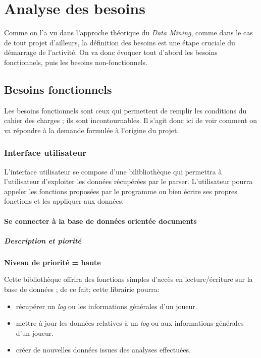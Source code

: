 \chapter{Analyse des besoins}


Comme on l'a vu dans l'approche théorique du \textit{Data Mining}, comme dans le cas de tout projet d'ailleurs, la définition des besoins est une étape cruciale du démarrage de l'activité. On va donc évoquer tout d'abord les besoins fonctionnels, puis les besoins non-fonctionnels.


\section{Besoins fonctionnels} 
Les besoins fonctionnels sont ceux qui permettent de remplir les conditions du cahier des charges ; ils sont incontournables. Il s'agit donc ici de voir comment on va répondre à la demande formulée à l'origine du projet.

\subsection{Interface utilisateur}
L'interface utilisateur se compose d'une bilibliothèque qui permettra à l'utilisateur d'exploiter les données récupérées par le parser. L'utilisateur pourra appeler les fonctions proposées par le programme ou bien écrire ses propres fonctions et les appliquer aux données.

\subsubsection{Se connecter à la base de données orientée documents}

\paragraph*{Description et piorité}

\textbf{Niveau de priorité = haute}

Cette bibliothèque offrira des fonctions simples d'accès en lecture/écriture sur la base de données ; de ce fait; cette librairie pourra:
\begin{itemize}
\item récupérer un \textit{log} ou les informations générales d'un joueur.
\item mettre à jour les données relatives à un \textit{log} ou aux informations générales d'un joueur.
\item créer de nouvelles données issues des analyses effectuées.
\end{itemize}

